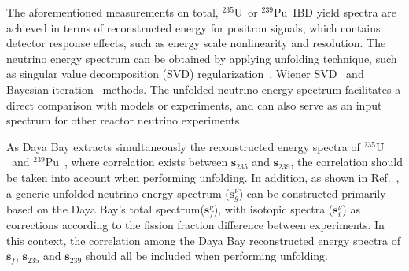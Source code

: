 \documentclass[aps,prl,showpacs,showkeys,amsmath,amssymb,twocolumn,floatfix,superscriptaddress,nofootinbib]{revtex4-1}
\newcommand{\Ufive}{$\mathrm{^{235}U}$}
\newcommand{\Punine}{$\mathrm{^{239}Pu}$}
\begin{document}
The aforementioned measurements on total, \Ufive\ or \Punine\ IBD yield spectra are achieved in terms of reconstructed energy for positron signals, which contains detector response effects, such as energy scale nonlinearity and resolution.
The neutrino energy spectrum can be obtained by applying unfolding technique, such as singular value decomposition (SVD) regularization~\cite{method_SVD}, Wiener SVD~\cite{method_WSVD} and Bayesian iteration~\cite{method_Bayesian} methods.
The unfolded neutrino energy spectrum facilitates a direct comparison with models or experiments, and can also serve as an input spectrum for other reactor neutrino experiments.


As Daya Bay extracts simultaneously the reconstructed energy spectra of \Ufive\ and \Punine\ , where correlation exists between $\bm{s}_{235}$ and $\bm{s}_{239}$, the correlation should be taken into account when performing unfolding.
In addition, as shown in Ref.~\cite{DYB_unfolding}, a generic unfolded neutrino energy spectrum ($\bm{s}^{\nu}_g$) can be constructed primarily based on the Daya Bay's total spectrum($\bm{s}^{\nu}_f$), with isotopic spectra ($\bm{s}^{\nu}_{i}$) as corrections according to the fission fraction difference between experiments.
In this context, the correlation among the Daya Bay reconstructed energy spectra of $\bm{s}_{f}$, $\bm{s}_{235}$ and $\bm{s}_{239}$ should all be included when performing unfolding.
\end{document}

